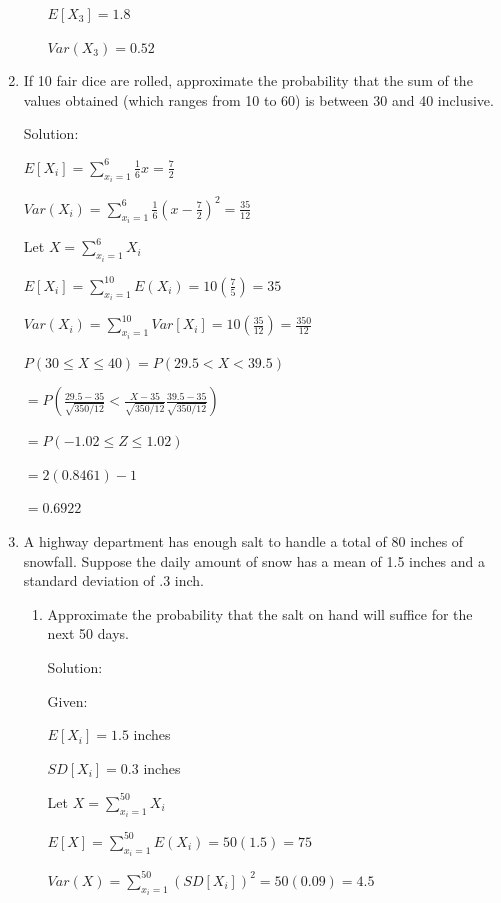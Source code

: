 \documentclass{article}
\begin{document}
\begin{enumerate}
\begin{enumerate}
        $\displaystyle E[X_3] = 1.8$

        $\displaystyle Var(X_3) = 0.52$

    \end{enumerate}  
    \item If 10 fair dice are rolled, approximate the probability that the sum of the values obtained (which ranges from 10 to 60) is between 30 and 40 inclusive.
    
    Solution:

    $E[X_i] = \displaystyle \sum_{x_i = 1}^6 {\frac{1}{6}x = \frac{7}{2}}$

    $Var(X_i) = \displaystyle \sum_{x_i = 1}^6 {\frac{1}{6}{(x - \frac{7}{2})}^2 = \frac{35}{12}}$

    Let $X = \displaystyle \sum_{x_i = 1}^6 {X_i}$

    $E[X_i] = \displaystyle \sum_{x_i = 1}^{10} {E(X_i)} = 10(\frac{7}{5}) = 35$

    $Var(X_i) = \displaystyle \sum_{x_i = 1}^{10} {Var[X_i]} = 10(\frac{35}{12}) = \frac{350}{12}$

    $P(30 \leq X \leq 40) = P(29.5 < X < 39.5)$

    $= \displaystyle P\left(\frac{29.5 - 35}{\sqrt{350/12}}<\frac{X - 35}{\sqrt{350/12}}\frac{39.5 - 35}{\sqrt{350/12}}\right)$

    $= \displaystyle P\left(-1.02 \leq Z \leq 1.02 \right)$

    $= 2(0.8461)-1$

    $=0.6922$

    \item A highway department has enough salt to handle a total of 80 inches of snowfall. Suppose the daily amount of snow has a mean of 1.5 inches and a standard deviation of .3 inch.
    \begin{enumerate}
        \item Approximate the probability that the salt on hand will suffice for the next 50 days.
        
        Solution:
        
        Given:

        $E[X_i] = 1.5$ inches

        $SD[X_i] = 0.3$ inches

        Let $X = \displaystyle \sum_{x_i = 1}^{50} {X_i} $

        $E[X] = \displaystyle \sum_{x_i = 1}^{50} {E(X_i)} = 50(1.5) = 75$

        $Var(X) = \displaystyle \sum_{x_i = 1}^{50} {(SD[X_i])^2 = 50(0.09) = 4.5}$
    

\end{enumerate}
\end{enumerate}
\end{document}
